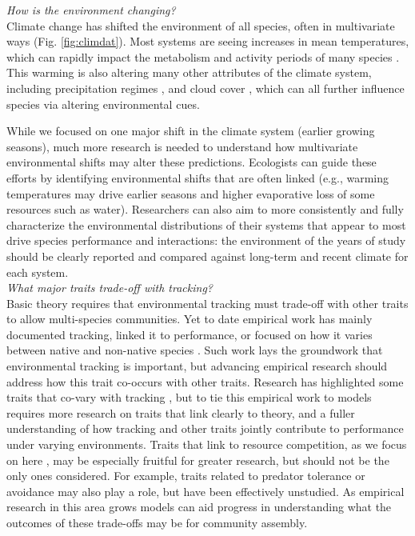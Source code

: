 \documentclass[11pt,letterpaper]{article}
\begin{document}
\emph{How is the environment changing?} \\ %

Climate change has shifted the environment of all species, often in multivariate ways (Fig. \ref{fig:climdat}). Most systems are seeing increases in mean temperatures, which can rapidly impact the metabolism and activity periods of many species \citep{Monson:2006vt,IPCC:2014sm}. This warming is also altering many other attributes of the climate system, including precipitation regimes \citep{Diffenbaugh2015}, and cloud cover \citep{hofer2017}, which can all further influence species via altering environmental cues. 

While we focused on one major shift in the climate system (earlier growing seasons), much more research is needed to understand how multivariate environmental shifts may alter these predictions. Ecologists can guide these efforts by identifying environmental shifts that are often linked (e.g., warming temperatures may drive earlier seasons and higher evaporative loss of some resources such as water). Researchers can also aim to more consistently and fully characterize the environmental distributions of their systems that appear to most drive species performance and interactions: the environment of the years of study should be clearly reported and compared against long-term and recent climate for each system.\\

\emph{What major traits trade-off with tracking?} \\

Basic theory requires that environmental tracking must trade-off with other traits to allow multi-species communities. Yet to date empirical work has mainly documented tracking, linked it to performance, or focused on how it varies between native and non-native species \citep{Willis:2010al,wolkovichAmBot2013,Zettlemoyer2019}. Such work lays the groundwork that environmental tracking is important, but advancing empirical research should address how this trait co-occurs with other traits. Research has highlighted some traits that co-vary with tracking \citep[e.g.,][]{kharouba2014,lasky2016,Zhu2016BioLetters}, but to tie this empirical work to models requires more research on traits that link clearly to theory, and a fuller understanding of how tracking and other traits jointly contribute to performance under varying environments. Traits that link to resource competition, as we focus on here \citep[as others have as well, see][]{volkerass}, may be especially fruitful for greater research, but should not be the only ones considered. For example, traits related to predator tolerance or avoidance may also play a role, but have been effectively unstudied.  As empirical research in this area grows models can aid progress in understanding what the outcomes of these trade-offs may be for community assembly.\\ 
\end{document}
